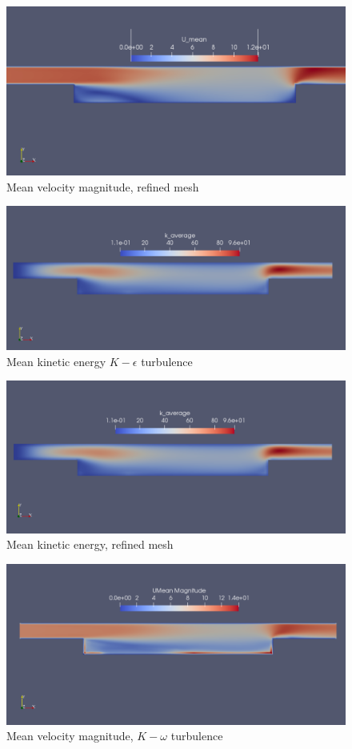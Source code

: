 \documentclass[paper=a4, fontsize=11pt]{article} %
\numberwithin{equation}{section} %
\numberwithin{figure}{section} %
\numberwithin{table}{section} %
\begin{document}
    \begin{figure}[H]
        \centering
        \includegraphics[width=0.6\linewidth]{Figures/simple_refined_U_mean}
        \caption{Mean velocity magnitude, refined mesh}
        \label{fig:MeanUSimpleRef}
    \end{figure}

    \begin{figure}[h]
        \centering
        \includegraphics[width=0.6\linewidth]{Figures/simple_K_mean}
        \caption{Mean kinetic energy $K - \epsilon$ turbulence}
        \label{fig:MeanKSimple}
    \end{figure}

    \begin{figure}[H]
        \centering
        \includegraphics[width=0.6\linewidth]{Figures/simple_refined_K_mean}
        \caption{Mean kinetic energy, refined mesh}
        \label{fig:MeanKSimpleRef}
    \end{figure}

    \begin{figure}[H]
        \centering
        \includegraphics[width=0.6\linewidth]{Figures/simple_KOmega_U_mean}
        \caption{Mean velocity magnitude, $K - \omega$ turbulence}
        \label{fig:MeanUKOmega}
    \end{figure}
\end{document}
